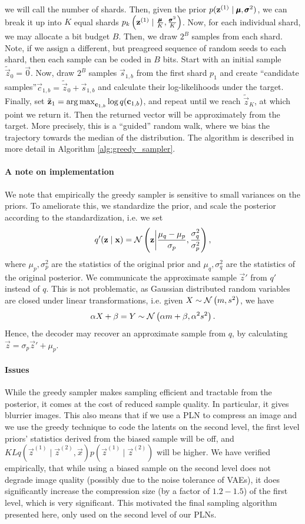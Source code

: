 we will call the number of shards. Then, given the prior $p(\mathbf{z}^{(1)} \mid
\pmb{\mu}, \pmb{\sigma}^2)$, we can break it up into $K$ equal shards $p_k\left(\mathbf{z}^{(1)}
\mid \frac{\pmb{\mu}}{K}, \frac{\pmb{\sigma}^2}{K}\right)$. Now, for each individual shard,
we may allocate a bit budget $B$. Then, we draw $2^B$ samples from each shard.
Note, if we assign a different, but preagreed sequence of random seeds to each
shard, then each sample can be coded in $B$ bits. Start with an initial sample
$\tilde{\vec{z}}_0 = \vec{0}$. Now, draw $2^B$ samples $\vec{s}_{1, b}$ from the
first shard $p_1$ and create ``candidate samples''$\vec{c}_{1, b} =
\tilde{\vec{z}}_0 + \vec{s}_{1, b}$ and calculate their log-likelihoods under the
target. Finally, set $\tilde{\mathbf{z}}_1 = \operatorname*{arg\,max}_{\mathbf{c}_{1, b}}\log
q(\mathbf{c}_{1, b})$, and repeat until we reach $\tilde{\vec{z}}_K$, at which
point we return it. Then the returned vector will be approximately from the
target. More precisely, this is a ``guided'' random walk, where we bias the
trajectory towards the median of the distribution. The algorithm is described in
more detail in Algorithm \ref{alg:greedy_sampler}.
\paragraph{A note on implementation}
We note that empirically the greedy sampler is sensitive to small variances on
the priors. To ameliorate this, we standardize the prior, and scale the
posterior according to the standardization, i.e. we set 
\[
  q'(\mathbf{z} \mid \mathbf{x}) = \mathcal{N}\left( \mathbf{z} \bigg| \frac{\mu_q -
      \mu_p}{\sigma_p}, \frac{\sigma^2_{q}}{\sigma^2_{p}} \right),
\]
where $\mu_p, \sigma^2_p$ are the statistics of the original prior and $\mu_q,
\sigma^2_q$ are the statistics of the original posterior. We communicate the
approximate sample $\vec{z}'$ from $q'$ instead of $q$. This is not problematic, as
Gaussian distributed random variables are closed under linear transformations,
i.e. given $X \sim \mathcal{N}\left( m, s^2 \right)$, we have
\[
  \alpha X + \beta = Y \sim \mathcal{N}\left( \alpha m + \beta, \alpha^2 s^2 \right).
\]
Hence, the decoder may recover an approximate sample from $q$, by calculating
$\vec{z} = \sigma_{p} \vec{z}' + \mu_{p}$.
\paragraph{Issues}
While the greedy sampler makes sampling efficient and tractable from the
posterior, it comes at the cost of reduced sample quality. In particular, it
gives blurrier images. This also means that if we use a PLN to compress an
image and we use the greedy technique to code the latents on the second level,
the first level priors' statistics derived from the biased sample will be off,
and $KL{q(\vec{z}^{(1)} \mid \vec{z}^{(2)}, \vec{x})}{p(\vec{z}^{(1)} \mid
  \vec{z}^{(2)})}$ will be higher. We have verified empirically, that while
using a biased sample on the second level does not degrade image quality
(possibly due to the noise tolerance of VAEs), it does significantly increase
the compression size (by a factor of $1.2 - 1.5$) of the first level, which is
very significant. This motivated the final sampling algorithm presented here,
only used on the second level of our PLNs.

